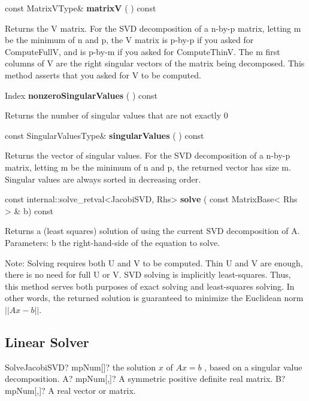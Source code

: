 \vspace{0.3cm}
const MatrixVType\& \textbf{matrixV}  ( )  const 

Returns the V matrix.
For the SVD decomposition of a n-by-p matrix, letting m be the minimum of n and p, the V matrix is p-by-p if you asked for ComputeFullV, and is p-by-m if you asked for ComputeThinV.
The m first columns of V are the right singular vectors of the matrix being decomposed.
This method asserts that you asked for V to be computed. 


\vspace{0.3cm}
Index \textbf{nonzeroSingularValues}  ( )  const 

Returns the number of singular values that are not exactly 0 


\vspace{0.3cm}
const SingularValuesType\& \textbf{singularValues}  ( )  const 

Returns the vector of singular values.
For the SVD decomposition of a n-by-p matrix, letting m be the minimum of n and p, the returned vector has size m. Singular values are always sorted in decreasing order. 


\vspace{0.3cm}
const internal::solve\_retval<JacobiSVD, Rhs> \textbf{solve}  ( const MatrixBase< Rhs > \&  b)  const 

Returns a (least squares) solution of  using the current SVD decomposition of A.
Parameters: b the right-hand-side of the equation to solve. 

Note: Solving requires both U and V to be computed. Thin U and V are enough, there is no need for full U or V.
SVD solving is implicitly least-squares. Thus, this method serves both purposes of exact solving and least-squares solving. In other words, the returned solution is guaranteed to minimize the Euclidean norm $||Ax-b||$. 




\subsection{Linear Solver}

\begin{mpFunctionsExtract}
	\mpFunctionTwo
	{SolveJacobiSVD? mpNum[]? the solution $x$ of $A x = b$ , based on a singular value decomposition.}
	{A? mpNum[,]? A symmetric positive definite real matrix.}
	{B? mpNum[,]? A real vector or matrix.}
\end{mpFunctionsExtract}


